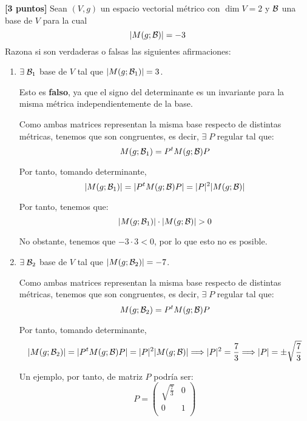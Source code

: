 \documentclass[12pt]{article}
\begin{document}
\begin{ejercicio}\textbf{[3 puntos]} Sean $(V,g)$ un espacio vectorial métrico con $\dim V=2$ y $\mathcal{B}$ una base de $V$ para la cual
\begin{equation*}
    |M(g;\mathcal{B})|=-3
\end{equation*}
Razona si son verdaderas o falsas las siguientes afirmaciones:
\begin{enumerate}
    \item $\exists\; \mathcal{B}_1$ base de $V$ tal que $|M(g;\mathcal{B}_1)|=3$.

    Esto es \textbf{falso}, ya que el signo del determinante es un invariante para la misma métrica independientemente de la base.

    Como ambas matrices representan la misma base respecto de distintas métricas, tenemos que son congruentes, es decir, $\exists\; P$ regular tal que:
    \begin{equation*}
        M(g;\mathcal{B}_1) = P^t M(g;\mathcal{B}) P
    \end{equation*}

    Por tanto, tomando determinante,
    \begin{equation*}
        |M(g;\mathcal{B}_1)| = |P^t M(g;\mathcal{B}) P| = |P|^2 |M(g;\mathcal{B})|
    \end{equation*}

    Por tanto, tenemos que:
    \begin{equation*}
        |M(g;\mathcal{B}_1)| \cdot |M(g;\mathcal{B})| > 0
    \end{equation*}

    No obstante, tenemos que $-3\cdot 3<0$, por lo que esto no es posible.

    \item $\exists\; \mathcal{B}_2$ base de $V$ tal que $|M(g;\mathcal{B}_2)|=-7$.

    Como ambas matrices representan la misma base respecto de distintas métricas, tenemos que son congruentes, es decir, $\exists\; P$ regular tal que:
    \begin{equation*}
        M(g;\mathcal{B}_2) = P^t M(g;\mathcal{B}) P
    \end{equation*}

    Por tanto, tomando determinante,
    \begin{equation*}
        |M(g;\mathcal{B}_2)| = |P^t M(g;\mathcal{B}) P| = |P|^2 |M(g;\mathcal{B})| \Longrightarrow |P|^2 = \frac{7}{3} \Longrightarrow |P|=\pm \sqrt{\frac{7}{3}}
    \end{equation*}

    Un ejemplo, por tanto, de matriz $P$ podría ser:
    \begin{equation*}
        P=\left(\begin{array}{cc}
                \sqrt{\frac{7}{3}} & 0 \\
                0 & 1 \\
            \end{array}\right)
    \end{equation*}


\end{enumerate}
\end{ejercicio}
\end{document}
